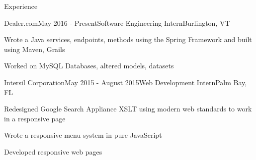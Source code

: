 \documentclass{resume} %
\begin{document}
\begin{rSection}{Experience}


\begin{rSubsection}{Dealer.com}{May 2016 - Present}{Software Engineering Intern}{Burlington, VT}

\item Wrote a Java services, endpoints, methods using the Spring Framework and built using Maven, Grails
\item Worked on MySQL Databases, altered models, datasets

\end{rSubsection}


\begin{rSubsection}{Intersil Corporation}{May 2015 - August 2015}{Web Development Intern}{Palm Bay, FL}

\item Redesigned Google Search Appliance XSLT using modern web standards to work in a responsive page
\item Wrote a responsive menu system in pure JavaScript
\item Developed responsive web pages %

\end{rSubsection}


\end{rSection}
\end{document}
